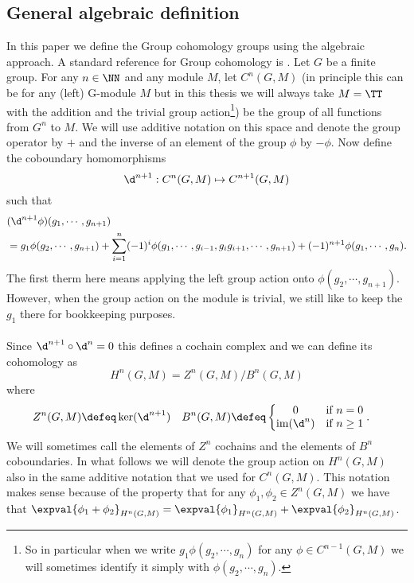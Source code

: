 \subsection{General algebraic definition}\label{sec:general-algebraic-definition}
In this paper we define the Group cohomology groups using the algebraic approach. A standard reference for Group cohomology is \cite{benson1991representations}. Let $G$ be a finite group. For any $n\in\NN$ and any module $M$, let $C^n(G,M)$ (in principle this can be for any (left) G-module $M$ but in this thesis we will always take $M=\TT$ with the addition and the trivial group action\footnote{So in particular when we write $g_1 \phi(g_2,\cdots,g_n)$ for any $\phi\in C^{n-1}(G,M)$ we will sometimes identify it simply with $\phi(g_2,\cdots,g_n)$.}) be the group of all functions from $G^n$ to $M$. We will use additive notation on this space and denote the group operator by $+$ and the inverse of an element of the group $\phi$ by $-\phi$. Now define the coboundary homomorphisms
\begin{equation}
	\d^{n+1}:C^n(G,M)\mapsto C^{n+1}(G,M)
\end{equation}
such that
\begin{align}
	&(\d^{n+1}\phi)(g_1,\cdots,g_{n+1})\\
	\nonumber
	&=g_1\phi(g_2,\cdots,g_{n+1})+\sum_{i=1}^n (-1)^i \phi(g_1,\cdots,g_{i-1},g_{i}g_{i+1},\cdots,g_{n+1})+(-1)^{n+1}\phi(g_1,\cdots,g_n).
\end{align}
The first therm here means applying the left group action onto $\phi(g_2,\cdots,g_{n+1})$. However, when the group action on the module is trivial, we still like to keep the $g_1$ there for bookkeeping purposes.\\\\
Since $\d^{n+1}\circ\d^{n}=0$ this defines a cochain complex and we can define its cohomology as
\begin{equation}
	H^n(G,M)=Z^n(G,M)/B^n(G,M)
\end{equation}
where
\begin{align}
	Z^n(G,M)&\defeq \ker(\d^{n+1})&B^n(G,M)&\defeq \left\{\begin{matrix}
		0&\text{if }n=0\\\textrm{im}(\d^n)&\text{if }n\geq 1
	\end{matrix}\right. .
\end{align}
We will sometimes call the elements of $Z^n$ cochains and the elements of $B^n$ coboundaries. In what follows we will denote the group action on $H^n(G,M)$ also in the same additive notation that we used for $C^n(G,M)$. This notation makes sense because of the property that for any $\phi_1,\phi_2\in Z^n(G,M)$ we have that $\expval{\phi_1+\phi_2}_{H^n(G,M)}=\expval{\phi_1}_{H^n(G,M)}+\expval{\phi_2}_{H^n(G,M)}$.
